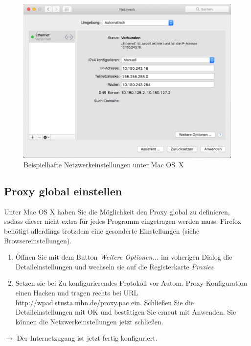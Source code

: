 \documentclass[a4paper,12pt]{scrartcl}
\begin{document}
\begin{enumerate}
\begin{figure}[h!]
\begin{minipage}[c]{0.38\linewidth}
        \end{minipage}
        \begin{minipage}[c]{0.60\linewidth}
          \centering
          \includegraphics[width=0.9\linewidth,keepaspectratio]{Bilder/IP_MAC}
          \caption{Beispielhafte Netzwerkeinstellungen unter Mac OS~X}
        \end{minipage}
      \vspace{-20pt}
      \end{figure}
\end{enumerate}
\vspace{-15pt}
\subsection*{Proxy global einstellen}
Unter Mac OS X haben Sie die Möglichkeit den Proxy global zu definieren, sodass dieser nicht extra für jedes Programm eingetragen werden muss. Firefox benötigt allerdings trotzdem eine gesonderte Einstellungen (siehe Browsereinstellungen). %

\begin{enumerate}%
    \item Öffnen Sie mit dem Button \emph{Weitere Optionen...} im voherigen Dialog die Detaileinstellungen und wechseln sie auf die Registerkarte \emph{Proxies}
    \item Setzen sie bei Zu konfigurierendes Protokoll vor Autom. Proxy-Konfiguration einen Hacken und tragen rechts bei URL \url{http://wpad.stusta.mhn.de/proxy.pac} ein. Schließen Sie die Detaileinstellungen mit OK und bestätigen Sie erneut mit Anwenden. Sie können die Netzwerkeinstellungen jetzt schließen.
\end{enumerate}
$\rightarrow$ Der Internetzugang ist jetzt fertig konfiguriert.
\end{document}
